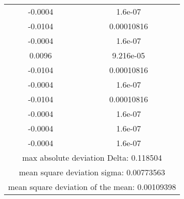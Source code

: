 \documentclass{article}
\begin{document}
\begin{tabular}{|c|c|}
-0.0004 & 1.6e-07 \\
-0.0104 & 0.00010816 \\
-0.0004 & 1.6e-07 \\
0.0096 & 9.216e-05 \\
-0.0104 & 0.00010816 \\
-0.0004 & 1.6e-07 \\
-0.0104 & 0.00010816 \\
-0.0004 & 1.6e-07 \\
-0.0004 & 1.6e-07 \\
-0.0004 & 1.6e-07 \\
\hline
\multicolumn{2}{|c|}{max absolute deviation Delta: 0.118504} \\
\hline
\multicolumn{2}{|c|}{mean square deviation sigma: 0.00773563} \\
\hline
\multicolumn{2}{|c|}{mean square deviation of the mean: 0.00109398} \\
\hline
\end{tabular}
\end{document}
